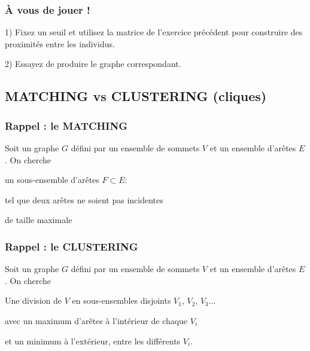 \documentclass[11pt]{beamer}
\newenvironment{slide}[1]{%
\begin{frame}[environment=slide]
\frametitle{#1}
}{%
\end{frame}
}
\begin{document}
\begin{slide}{{\`A} vous de jouer !}

1) Fixez un seuil et utilisez la matrice de l'exercice précédent pour construire des proximités entre les individus. \\

\vspace{0.3cm}

2) Essayez de produire le graphe correspondant.

\end{slide}

\subsection{MATCHING vs CLUSTERING (cliques)}

\begin{slide}{Rappel : le MATCHING}
Soit un graphe $G$ défini par un ensemble de sommets $V$ et un ensemble d'arêtes $E$. On cherche 

\vspace{0.5cm}

\pause

un sous-ensemble d'arêtes $F \subset E$:

\vspace{0.5cm}

\pause

tel que deux arêtes ne soient pas incidentes

\vspace{0.5cm}

\pause

de taille maximale

\end{slide}


\begin{slide}{Rappel : le CLUSTERING}
Soit un graphe $G$ défini par un ensemble de sommets $V$ et un ensemble d'arêtes $E$. On cherche 

\vspace{0.5cm}

\pause

Une division de $V$ en sous-ensembles disjoints $V_1$, $V_2$, $V_3$...

\vspace{0.5cm}

\pause

avec un maximum d'arêtes à l'intérieur de chaque $V_i$

\vspace{0.5cm}

\pause

et un minimum à l'extérieur, entre les différents $V_i$.

\end{slide}
\end{document}
